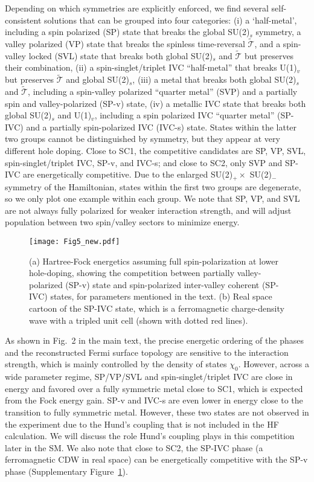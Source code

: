 \documentclass[aps,pra,twocolumn,superscriptaddress,10pt,article,nofootinbib,showpacs,longbibliography]{revtex4-1}
\begin{document}
Depending on which symmetries are explicitly enforced, we find several self-consistent solutions that can be grouped into four categories: (i) a `half-metal', including a spin polarized (SP) state that breaks the global SU(2)$_s$ symmetry, a valley polarized (VP) state that breaks the spinless time-reversal $\tilde{\mathcal{T}}$, and a spin-valley locked (SVL) state that breaks both global SU(2)$_s$ and $\tilde{\mathcal{T}}$ but preserves their combination, (ii) a spin-singlet/triplet IVC ``half-metal'' that breaks U(1)$_v$ but preserves $\tilde{\mathcal{T}}$ and global SU(2)$_s$, (iii) a metal that breaks both global SU(2)$_s$ and $\tilde{\mathcal{T}}$, including a spin-valley polarized ``quarter metal'' (SVP) and a partially spin and valley-polarized (SP-v) state, (iv) a metallic IVC state that breaks both global SU(2)$_s$ and U(1)$_v$, including a spin polarized IVC ``quarter metal'' (SP-IVC) and a partially spin-polarized IVC (IVC-s) state. States within the latter two groups cannot be distinguished by symmetry, but they appear at very different hole doping. Close to SC1, the competitive candidates are SP, VP, SVL, spin-singlet/triplet IVC, SP-v, and IVC-s; and close to SC2, only SVP and SP-IVC are energetically competitive. Due to the enlarged SU(2)$_+ \times$ SU(2)$_-$ symmetry of the Hamiltonian, states within the first two groups are degenerate, so we only plot one example within each group. We note that SP, VP, and SVL are not always fully polarized for weaker interaction strength, and will adjust population between two spin/valley sectors to minimize energy. 

\begin{figure}[htbp]
    \centering
    \texttt{[image: Fig5\_new.pdf]}
    \caption{(a) Hartree-Fock energetics assuming full spin-polarization at lower hole-doping, showing the competition between partially valley-polarized (SP-v) state and spin-polarized inter-valley coherent (SP-IVC) states, for parameters mentioned in the text. (b) Real space cartoon of the SP-IVC state, which is a ferromagnetic charge-density wave with a tripled unit cell (shown with dotted red lines).}
    \label{fig:SC2}
\end{figure}

As shown in Fig.~2 in the main text, the precise energetic ordering of the phases and the reconstructed Fermi surface topology are sensitive to the interaction strength, which is mainly controlled by the density of states $\chi_0$. However, across a wide parameter regime, SP/VP/SVL and spin-singlet/triplet IVC are close in energy and favored over a fully symmetric metal close to SC1, which is expected from the Fock energy gain. SP-v and IVC-s are even lower in energy close to the transition to fully symmetric metal. However, these two states are not observed in the experiment due to the Hund's coupling that is not included in the HF calculation. We will discuss the role Hund's coupling plays in this competition later in the SM. We also note that close to SC2, the SP-IVC phase (a ferromagnetic CDW in real space) can be energetically competitive with the SP-v phase (Supplementary Figure~\ref{fig:SC2}).
\end{document}

